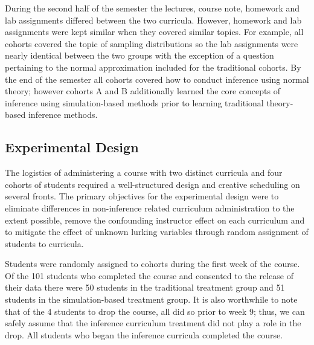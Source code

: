 \documentclass[11pt]{isuthesis}\usepackage[]{graphicx}\usepackage[]{color}
\begin{document}
During the second half of the semester the lectures, course note, homework and lab assignments differed between the two curricula.  However, homework and lab assignments were kept similar when they covered similar topics.  For example, all cohorts covered the topic of sampling distributions so the lab assignments were nearly identical between the two groups with the exception of a question pertaining to the normal approximation included for the traditional cohorts.  By the end of the semester all cohorts covered how to conduct inference using normal theory; however cohorts A and B additionally learned the core concepts of inference using simulation-based methods prior to learning traditional theory-based inference methods.  

\subsection{Experimental Design}
\label{design}

The logistics of administering a course with two distinct curricula and four cohorts of students required a well-structured design and creative scheduling on several fronts.  The primary objectives for the experimental design were to eliminate differences in non-inference related curriculum administration to the extent possible, remove the confounding instructor effect on each curriculum and to mitigate the effect of unknown lurking variables through random assignment of students to curricula.  

Students were randomly assigned to cohorts during the first week of the course.  Of the 101 students who completed the course and consented to the release of their data there were 50 students in the traditional treatment group and 51 students in the simulation-based treatment group. It is also worthwhile to note that of the 4 students to drop the course, all did so prior to week 9; thus, we can safely assume that the inference curriculum treatment did not play a role in the drop. All students who began the inference curricula completed the course.
\end{document}
